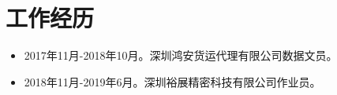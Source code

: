 \section{工作经历}
\begin{itemize}
	\item 2017年11月-2018年10月。深圳鸿安货运代理有限公司数据文员。
	\item 2018年11月-2019年6月。深圳裕展精密科技有限公司作业员。
\end{itemize}
